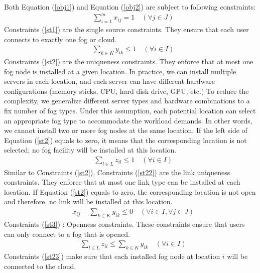 \documentclass[10pt,journal,compsoc]{IEEEtran}
\newcommand{\Eq}[1]{(\ref{#1})}
\begin{document}
Both Equation \Eq{obj1} and Equation \Eq{obj2} are subject to following constraints:
\begin{align}
&\sum_{i=1}^m x_{ij} =1\quad  (\forall j \in J )\label{st1}
\end{align}
Constraints \Eq{st1} are the single source constraints. They ensure that each user connects to exactly one fog or cloud. \\
\begin{align}
&\sum_{k\in K} y_{ik} \leq1 \quad(\forall i \in I )\label{st2}
\end{align}
Constraints \Eq{st2} are the uniqueness constraints. They enforce that at most one fog node is installed at a given location.  In practice, we can install multiple servers in each location, and each server can have different hardware configurations (memory sticks, CPU, hard disk drive, GPU, etc.) To reduce the complexity, we generalize different server types and hardware combinations to a fix number of fog types. Under this assumption, each potential location can select an appropriate fog type to accommodate the workload demands. In other words, we cannot install two or more fog nodes at the same location. If the left side of Equation \Eq{st2} equals to zero, it means that the corresponding location is not selected; no fog facility will be installed at this location.\\
\begin{align}
&\sum_{l\in L} z_{il} \leq1\quad(\forall i \in I) \label{st22}
\end{align}
Similar to Constraints \Eq{st2}, Constraints \Eq{st22} are the link uniqueness constraints. They enforce that at most one link type can be installed at each location. If Equation \Eq{st2} equals to zero, the corresponding location is not open and therefore, no link will be installed at this location.\\
\begin{align}
& x_{ij} - \sum_{k\in K} y_{ik}\leq0  \quad(\forall i \in I,\forall j \in J)\label{st3}
\end{align}
Constraints \Eq{st3} : Openness constraints. These constraints ensure that users can only connect to a fog that is opened.\\
\begin{align}
&\sum_{l\in L} z_{il} \leq \sum_{k\in K} y_{ik} \quad (\forall i \in I) \label{st23}
\end{align}
Constraints \Eq{st23} make sure that each installed fog node at location $i$ will be connected to the cloud.\\
\end{document}
